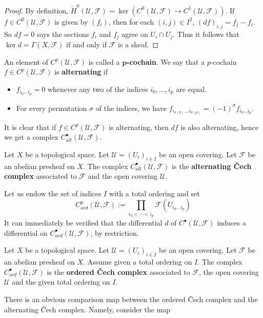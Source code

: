 \begin{proof}
By definition, $\check{H}^0(\mathcal{U},\mathscr{F})=\ker(C^0(\mathcal{U},\mathscr{F})\to C^1(\mathcal{U},\mathscr{F}))$. If $f\in C^0(\mathcal{U},\mathscr{F})$ is given by $(f_i)$, then for each $(i,j)\in I^2$, $(df)_{i,j}=f_j-f_i$. So $df=0$ says the sections $f_i$ and $f_j$ agree on $U_i\cap U_j$. Thus it follows that $\ker d=\Gamma(X,\mathscr{F})$ if and only if $\mathscr{F}$ is a sheaf.
\end{proof}
An element of $C^p(\mathcal{U},\mathscr{F})$ is called a \textbf{$\bm{p}$-cochain}. We say that a $p$-cochain $f\in C^p(\mathcal{U},\mathscr{F})$ is \textbf{alternating} if
\begin{itemize}
\item $f_{i_0\dots i_p}=0$ whenever any two of the indices $i_0,\dots,i_p$ are equal.
\item For every permutation $\sigma$ of the indices, we have $f_{i_{\sigma(0)}\dots i_{\sigma(p)}}=(-1)^\sigma f_{i_0\dots i_p}$.
\end{itemize} 
It is clear that if $f\in C^p(\mathcal{U},\mathscr{F})$ is alternating, then $df$ is also alternating, hence we get a complex $C_{alt}^\bullet(\mathcal{U},\mathscr{F})$.
\begin{definition}
Let $X$ be a topological space. Let $\mathcal{U}=(U_i)_{i\in I}$ be an open covering. Let $\mathscr{F}$ be an abelian presheaf on $X$. The complex $C^\bullet_{alt}(\mathcal{U},\mathscr{F})$ is the \textbf{alternating \v{C}ech complex} associated to $\mathscr{F}$ and the open covering $\mathcal{U}$.
\end{definition}
Let us endow the set of indices $I$ with a total ordering and set
\[C_{ord}^{p}(\mathcal{U},\mathscr{F}):=\prod_{i_0<\cdots<i_p}\mathscr{F}(U_{i_0\dots i_p})\]
It can immediately be verified that the differential $d$ of $C^\bullet(\mathcal{U},\mathscr{F})$ induces a differential on $C_{ord}^\bullet(\mathcal{U},\mathscr{F})$, by restriction.
\begin{definition}
Let $X$ be a topological space. Let $\mathcal{U}=(U_i)_{i\in I}$ be an open covering. Let $\mathscr{F}$ be an abelian presheaf on $X$. Assume given a total ordering on $I$. The complex $C^\bullet_{ord}(\mathcal{U},\mathscr{F})$ is the \textbf{ordered \v{C}ech complex} associated to $\mathscr{F}$, the open covering $\mathcal{U}$ and the given total ordering on $I$.
\end{definition}
There is an obvious comparison map between the ordered \v{C}ech complex and the alternating \v{C}ech complex. Namely, consider the map
